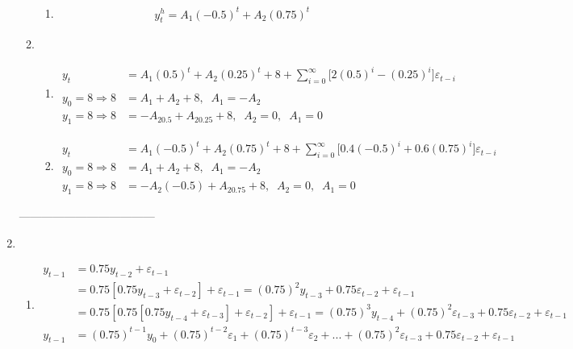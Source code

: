 \begin{enumerate}
\begin{enumerate}
\begin{enumerate}
					\item %
					\begin{align*}
						y_t^h=A_1(-0.5)^t+A_2(0.75)^t
					\end{align*}
					
				\end{enumerate}
				
				\item %
				\begin{enumerate}
					\item %
					\begin{align*}
					y_t&=A_1(0.5)^t+A_2(0.25)^t+8+\sum\limits_{i=0}^{\infty}\bigg[2(0.5)^i-(0.25)^i\bigg]\varepsilon_{t-i}\\
					\\
					y_0=8\Rightarrow8&=A_1+A_2+8,\;\;A_1=-A_2\\
					y_1=8\Rightarrow 8&=-A_20.5+A_20.25+8,\;\;A_2=0, \;\;A_1=0
					\end{align*}
					
					\item %
					\begin{align*}
					y_t&=A_1(-0.5)^t+A_2(0.75)^t+8+\sum\limits_{i=0}^{\infty}\Bigg[0.4(-0.5)^i+0.6(0.75)^i\Bigg]\varepsilon_{t-i}\\
					y_0=8\Rightarrow 8&=A_1+A_2+8,\;\; A_1=-A_2\\ 
					y_1=8\Rightarrow 8&=-A_2(-0.5)+A_20.75+8,\;\; A_2=0,\;\;A_1=0
					\end{align*}
					
				\end{enumerate}
				
		\end{enumerate}
		
	------------------------------------
		
	\item %
		\begin{enumerate}
			\item %
			\begin{align*}
				y_{t-1}&=0.75y_{t-2}+\varepsilon_{t-1}\\
				&=0.75[0.75y_{t-3}+\varepsilon_{t-2}]+\varepsilon_{t-1}=(0.75)^2y_{t-3}+0.75\varepsilon_{t-2}+\varepsilon_{t-1}\\
				&=0.75[0.75[0.75y_{t-4}+\varepsilon_{t-3}]+\varepsilon_{t-2}]+\varepsilon_{t-1}=(0.75)^3y_{t-4}+(0.75)^2\varepsilon_{t-3}+0.75\varepsilon_{t-2}+\varepsilon_{t-1}\\
				y_{t-1}&=(0.75)^{t-1}y_0+(0.75)^{t-2}\varepsilon_1+(0.75)^{t-3}\varepsilon_2+...+(0.75)^2\varepsilon_{t-3}+0.75\varepsilon_{t-2}+\varepsilon_{t-1}\\
		\end{align*}
		

\end{enumerate}
\end{enumerate}
